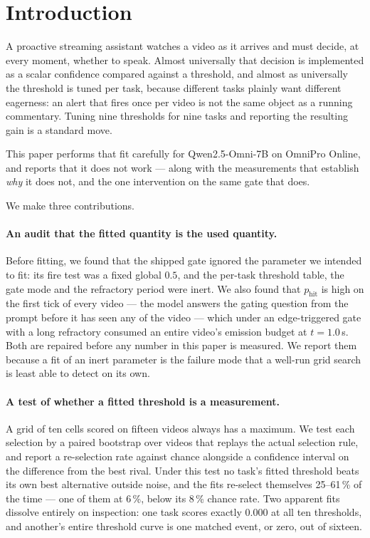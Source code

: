 \section{Introduction}
\label{sec:intro}

A proactive streaming assistant watches a video as it arrives and must decide, at
every moment, whether to speak. Almost universally that decision is implemented as
a scalar confidence compared against a threshold, and almost as universally the
threshold is tuned per task, because different tasks plainly want different
eagerness: an alert that fires once per video is not the same object as a running
commentary. Tuning nine thresholds for nine tasks and reporting the resulting gain
is a standard move.

This paper performs that fit carefully for Qwen2.5-Omni-7B on OmniPro Online, and
reports that it does not work --- along with the measurements that establish
\emph{why} it does not, and the one intervention on the same gate that does.

We make three contributions.

\paragraph{An audit that the fitted quantity is the used quantity.} Before fitting,
we found that the shipped gate ignored the parameter we intended to fit: its fire
test was a fixed global $0.5$, and the per-task threshold table, the gate mode and
the refractory period were inert. We also found that $p_{\mathrm{hit}}$ is high on
the first tick of every video --- the model answers the gating question from the
prompt before it has seen any of the video --- which under an edge-triggered gate
with a long refractory consumed an entire video's emission budget at $t=1.0$\,s.
Both are repaired before any number in this paper is measured. We report them
because a fit of an inert parameter is the failure mode that a well-run grid search
is least able to detect on its own.

\paragraph{A test of whether a fitted threshold is a measurement.} A grid of ten
cells scored on fifteen videos always has a maximum. We test each selection by a
paired bootstrap over videos that replays the actual selection rule, and report a
re-selection rate against chance alongside a confidence interval on the difference
from the best rival. Under this test no task's fitted threshold beats its own best
alternative outside noise, and the fits re-select themselves 25--61\,\% of the time
--- one of them at 6\,\%, below its 8\,\% chance rate. Two apparent fits dissolve
entirely on inspection: one task scores exactly $0.000$ at all ten thresholds, and
another's entire threshold curve is one matched event, or zero, out of sixteen.

